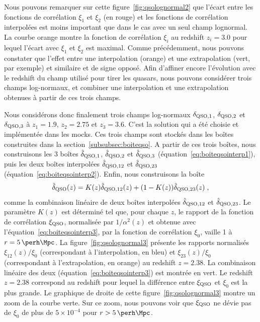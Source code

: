 \documentclass[11pt, twoside, a4paper, openright]{report}
\begin{document}
Nous pouvons remarquer sur cette figure~\ref{fig:qsolognormal2} que l'écart entre les fonctions de corrélation $\xi_1$ et $\xi_2$ (en rouge) et les fonctions de corrélation interpolées est moins important que dans le cas avec un seul champ lognormal. La courbe orange montre la fonction de corrélation $\xi_i$ au redshift $z_i = \num{3.0}$ pour lequel l'écart avec $\xi_1$ et $\xi_2$ est maximal.
Comme précédemment, nous pouvons constater que l'effet entre une interpolation (orange) et une extrapolation (vert, par exemple) et similaire et de signe opposé. Afin d'affiner encore l'évolution avec le redshift du champ utilisé pour tirer les quasars, nous pouvons considérer trois champs log-normaux, et combiner une interpolation et une extrapolation obtenues à partir de ces trois champs.

Nous considérons donc finalement trois champs log-normaux $\delta_{\textsc{QSO},1}$, $\delta_{\textsc{QSO},2}$ et $\delta_{\textsc{QSO},3}$  à $z_1 = \num{1.9}$,  $z_2 = \num{2.75}$  et $z_3 = \num{3.6}$. C'est la solution qui a été choisie et implémentée dans les mocks. Ces trois champs sont stockés dans les boîtes construites dans la section~\ref{subsubsec:boiteqso}. A partir de ces trois boîtes, nous construisons les 3 boîtes $\hat \delta_{\textsc{QSO},1}$, $\hat \delta_{\textsc{QSO},2}$ et $\hat \delta_{\textsc{QSO},3}$ (équation~\ref{eq:boiteqsointerp1}), puis les deux boîtes interpolées $\hat \delta_{\textsc{QSO},12}$ et $\hat \delta_{\textsc{QSO},23}$ (équation~\ref{eq:boiteqsointerp2}). Enfin, nous construisons la boîte
\begin{equation}
  \label{eq:boiteqsointerp3}
  \hat \delta_{\textsc{QSO}}(z) = K(z) \hat \delta_{\textsc{QSO}, 12}(z) + (1 - K(z)) \hat \delta_{\textsc{QSO}, 23}(z) \; ,
\end{equation}
comme la combinaison linéaire de deux boîtes interpolées $\hat \delta_{\textsc{QSO},12}$ et $\hat \delta_{\textsc{QSO},23}$. Le paramètre $K(z)$ est déterminé tel que, pour chaque $z$, le rapport de la fonction de corrélation $\xi_{\textsc{QSO}}$, normalisée par $1/\alpha^2(z)$ et obtenue avec l'équation~\ref{eq:boiteqsointerp3}, par la fonction de corrélation $\xi_0$, vaille 1 à $r = \SI{5}{\perh\Mpc}$. La figure~\ref{fig:qsolognormal3} présente les rapports normalisés $\xi_{12}(z) / \xi_0$ (correspondant à l'interpolation, en bleu) et $\xi_{23}(z) / \xi_0$ (correspondant à l'extrapolation, en orange) au redshift $z = \num{2.38}$. La combinaison linéaire des deux (équation~\ref{eq:boiteqsointerp3}) est montrée en vert. Le redshift $z = \num{2.38}$ correspond au redshift pour lequel la différence entre $\xi_{\textsc{QSO}}$ et $\xi_0$ est la plus grande. Le graphique de droite de cette figure~\ref{fig:qsolognormal3} montre un zoom de la courbe verte. Sur ce zoom, nous pouvons voir que $\xi_{\textsc{QSO}}$ ne dévie pas de $\xi_0$ de plus de $5\times 10^{-4}$ pour $r > \SI{5}{\perh\Mpc}$.
\end{document}
